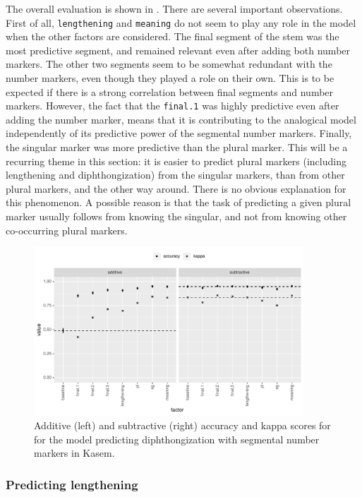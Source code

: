 The overall evaluation is shown in . There are several important observations. First of all, \texttt{lengthening} and \texttt{meaning} do not seem to play any role in the model when the other factors are considered. The final segment of the stem was the most predictive segment, and remained relevant even after adding both number markers. The other two segments seem to be somewhat redundant with the number markers, even though they played a role on their own. This is to be expected if there is a strong correlation between final segments and number markers. However, the fact that the \texttt{final.1} was highly predictive even after adding the number marker, means that it is contributing to the analogical model independently of its predictive power of the segmental number markers. Finally, the singular marker was more predictive than the plural marker. This will be a recurring theme in this section: it is easier to predict plural markers (including lengthening and diphthongization) from the singular markers, than from other plural markers, and the other way around. There is no obvious explanation for this phenomenon. A possible reason is that the task of predicting a given plural marker usually follows from knowing the singular, and not from knowing other co-occurring plural markers.

\begin{figure}
  \centering
  \includegraphics[width=0.9\textwidth]{./figures/kasem/p-fi-dp-sg-overall.pdf}
  \caption{Additive (left) and subtractive (right) accuracy and kappa scores for for the model predicting diphthongization with segmental number markers in Kasem.}\label{fig:overall-fi-dp}
\end{figure}

\subsubsection{Predicting lengthening}\label{subsec:pred-length}

